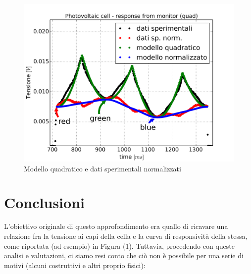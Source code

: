 \documentclass[journal, a4paper]{IEEEtran}
\begin{document}
\begin{figure}
\centering
\includegraphics[width=0.8\linewidth]{./relaz_colori/7_315_quadr_dati+modello}
\caption{Modello quadratico e dati sperimentali normalizzati}
\label{fig:7_315_quadr_dati+modello}
\end{figure}


\section{Conclusioni}

L'obiettivo originale di questo approfondimento era quallo di ricavare una relazione fra la tensione ai capi della cella e la curva di responsività della stessa, come riportata (ad esempio) in Figura (1). Tuttavia, procedendo con queste analisi e valutazioni, ci siamo resi conto che ciò non è possibile per una serie di motivi (alcuni costruttivi e altri proprio fisici):
\end{document}
